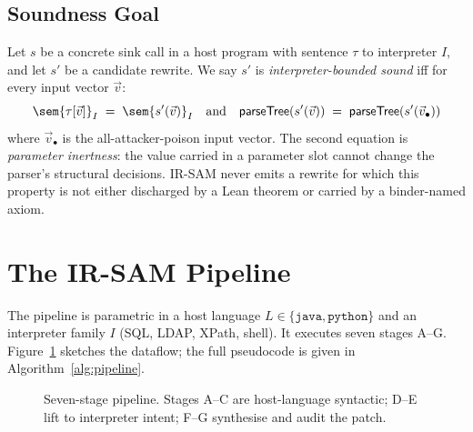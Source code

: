 \documentclass[conference]{IEEEtran}
\newcommand{\IRSAM}{\textsc{IR-SAM}}
\newcommand{\sig}{\textsc{SIG}}
\newcommand{\phisig}{\ensuremath{\varphi}}
\begin{document}
\subsection{Soundness Goal}
Let $s$ be a concrete sink call in a host program with sentence
$\tau$ to interpreter $I$, and let $s'$ be a candidate rewrite. We
say $s'$ is \emph{interpreter-bounded sound} iff for every input
vector $\vec{v}$:
\[
\sem{\tau[\vec{v}]}_I \;=\; \sem{s'(\vec{v})}_I
\quad\text{and}\quad
\textsf{parseTree}(s'(\vec{v})) \;=\; \textsf{parseTree}(s'(\vec{v}_\bullet))
\]
where $\vec{v}_\bullet$ is the all-attacker-poison input vector. The
second equation is \emph{parameter inertness}: the value carried in
a parameter slot cannot change the parser's structural decisions.
\IRSAM{} never emits a rewrite for which this property is not either
discharged by a Lean theorem or carried by a binder-named axiom.

\section{The \IRSAM{} Pipeline}\label{sec:pipeline}

The pipeline is parametric in a host language $L \in
\{\texttt{java}, \texttt{python}\}$ and an interpreter family $I$
(SQL, LDAP, XPath, shell). It executes seven stages A--G.
Figure~\ref{fig:pipeline} sketches the dataflow; the full
pseudocode is given in Algorithm~\ref{alg:pipeline}.

\begin{figure}[t]
\centering
{}
\caption{Seven-stage pipeline. Stages A--C are host-language
syntactic; D--E lift to interpreter intent; F--G synthesise and
audit the patch.}\label{fig:pipeline}
\end{figure}
\end{document}
